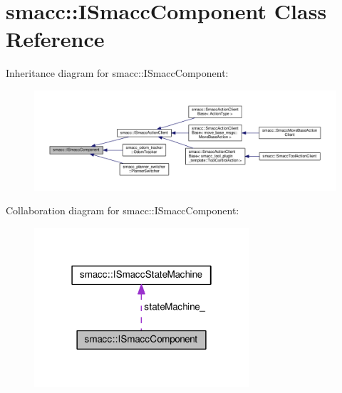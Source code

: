 \hypertarget{classsmacc_1_1ISmaccComponent}{\section{smacc\-:\-:I\-Smacc\-Component Class Reference}
\label{classsmacc_1_1ISmaccComponent}
}


Inheritance diagram for smacc\-:\-:I\-Smacc\-Component\-:
\nopagebreak
\begin{figure}[H]
\begin{center}
\leavevmode
\includegraphics[width=350pt]{classsmacc_1_1ISmaccComponent__inherit__graph}
\end{center}
\end{figure}


Collaboration diagram for smacc\-:\-:I\-Smacc\-Component\-:
\nopagebreak
\begin{figure}[H]
\begin{center}
\leavevmode
\includegraphics[width=226pt]{classsmacc_1_1ISmaccComponent__coll__graph}
\end{center}
\end{figure}
